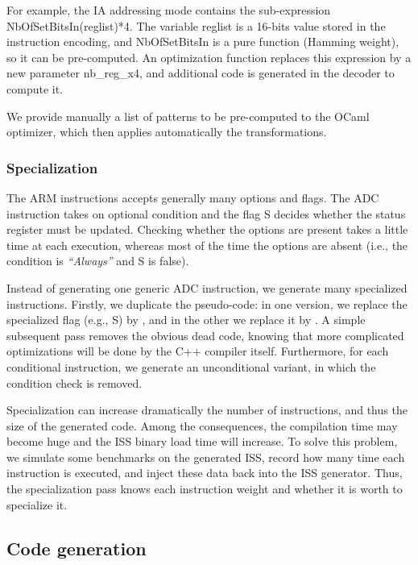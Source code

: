 \documentclass[conference]{ieeeconf}
\begin{document}
For example, the {\stt IA} addressing mode contains the sub-expression {\stt
  NbOfSetBitsIn(reglist)*4}. The variable {\stt reglist} is a 16-bits value
stored in the instruction encoding, and {\stt NbOfSetBitsIn} is a pure function
(Hamming weight), so it can be pre-computed. An optimization function replaces
this expression by a new parameter {\stt nb\_reg\_x4}, and additional code is
generated in the decoder to compute it.

We provide manually a list of patterns to be pre-computed to the OCaml
optimizer, which then applies automatically the transformations.


\subsubsection{Specialization}

The ARM instructions accepts generally many options and flags. The
{\stt ADC instruction} takes on optional condition and the flag {\stt
  S} decides whether the status register must be updated. Checking
whether the options are present takes a little time at each execution,
whereas most of the time the options are absent (i.e., the condition
is {\em ``Always''} and {\stt S} is false).

Instead of generating one generic {\stt ADC} instruction, we generate many
specialized instructions. Firstly, we duplicate the pseudo-code: in one version,
we replace the specialized flag (e.g., {\stt S}) by {}, and in the other
we replace it by {}. A simple subsequent pass removes the obvious dead
code, knowing that more complicated optimizations will be done by the C++
compiler itself. Furthermore, for each conditional instruction, we generate an
unconditional variant, in which the condition check is removed.

Specialization can increase dramatically the number of instructions, and thus
the size of the generated code. Among the consequences, the compilation time may
become huge and the ISS binary load time will increase. To solve this problem,
we simulate some benchmarks on the generated ISS, record how many time each
instruction is executed, and inject these data back into the ISS
generator. Thus, the specialization pass knows each instruction weight and
whether it is worth to specialize it.

\subsection{Code generation}
\end{document}

